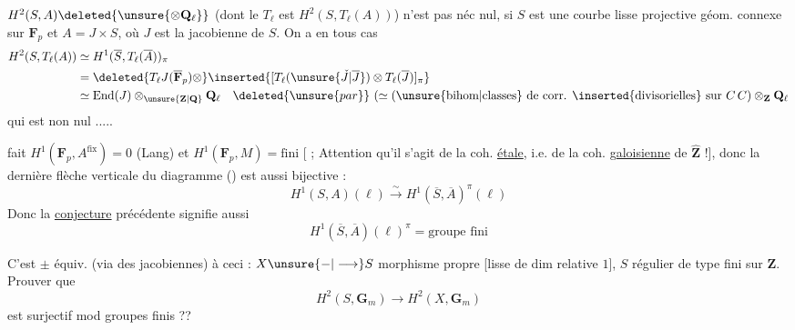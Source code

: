 $H^2(S,A)\deleted{\unsure{\otimes\mathbf{Q}_\ell}}$ (dont le $T_\ell$ est $H^2(S,T_\ell(A))$) n'est pas néc nul,   si $S$ est une courbe lisse projective géom. connexe sur $\mathbf{F}_p$ et $A=J\times S$, où $J$ est la jacobienne de $S$.
On a en tous cas
\[
\begin{aligned}
H^2(S,T_\ell(A))&\simeq H^1(\overline{S},T_\ell(\overline{A}))_\pi\\
&=\deleted{T_\ell J(\overline{\mathbf{F}}_p)\otimes}\inserted{[T_\ell(\unsure{\check{J}|\overline{J}})\otimes T_\ell(\overline{J})]_\pi}\\
&\simeq\mathrm{End}(J)\otimes_{\unsure{\mathbf{Z}|\mathbf{Q}}}\mathbf{Q}_\ell\quad\deleted{\unsure{par}}\ (\simeq(\unsure{\text{bihom}|\text{classes}}\text{ de corr. }\inserted{\text{divisorielles}}\text{ sur }C\,C)\otimes_{\mathbf{Z}}\mathbf{Q}_\ell
\end{aligned}
\]
qui est non nul .....

fait $H^1(\mathbf{F}_p,A^{\mathrm{fix}})=0$ (Lang) et $H^1(\mathbf{F}_p,M)=\text{fini}$ [ ; Attention qu'il s'agit de la coh. \uline{étale}, i.e. de la coh. \uline{galoisienne} de $\widehat{\mathbf{Z}}$ !], donc la dernière flèche verticale du diagramme () est aussi bijective :
\[
H^1(S,A)(\ell)\xrightarrow{\sim}H^1(\overline{S},\overline{A})^\pi(\ell)
\]
Donc la \uline{conjecture} précédente signifie aussi
\[
\boxed{H^1(\overline{S},\overline{A})(\ell)^\pi=\text{groupe fini}}
\]

C'est  $\pm$ équiv. (via des jacobiennes) à ceci : $X\unsure{-|\longrightarrow}S$ morphisme propre [lisse de dim relative $1$], $S$ régulier de type fini sur $\mathbf{Z}$. Prouver que
\[
H^2(S,\mathbf{G}_m)\longrightarrow H^2(X,\mathbf{G}_m)
\]
est surjectif mod groupes finis ??


